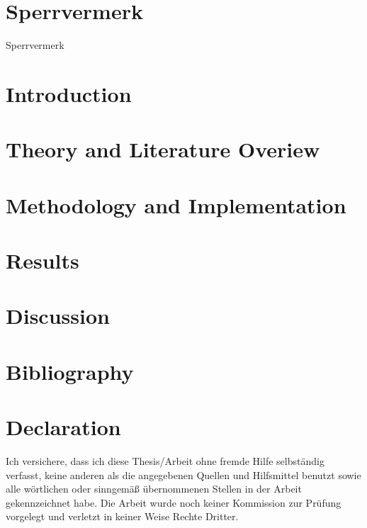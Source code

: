 \documentclass[11pt,twoside]{report}
\begin{document}

\newpage\null\thispagestyle{empty}\newpage


\chapter*{Sperrvermerk}
Sperrvermerk
\newpage\null\thispagestyle{empty}\newpage



\newpage\null\thispagestyle{empty}\newpage







\tableofcontents


\newpage\null\thispagestyle{empty}\newpage

\chapter{Introduction}



\chapter{Theory and Literature Overiew}


\chapter{Methodology and Implementation}


\chapter{Results}


\chapter{Discussion}


\listoffigures

\listoftables

\chapter*{Bibliography}
\printbibliography[heading=none]

\chapter*{Declaration}
Ich versichere, dass ich diese Thesis/Arbeit
ohne fremde Hilfe selbständig verfasst,
keine anderen als die angegebenen Quellen und Hilfsmittel benutzt sowie alle wörtlichen oder sinngemäß übernommenen Stellen in der Arbeit gekennzeichnet habe. Die
Arbeit wurde noch keiner Kommission zur
Prüfung vorgelegt und verletzt in keiner
Weise Rechte Dritter.
\end{document}
